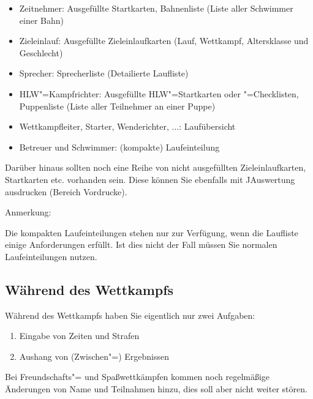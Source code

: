 \documentclass[11pt,a4paper,twoside,ngerman]{article}
\begin{document}
\begin{itemize}

\item Zeitnehmer: Ausgefüllte Startkarten, Bahnenliste (Liste aller Schwimmer einer Bahn)


\item Zieleinlauf: Ausgefüllte Zieleinlaufkarten (Lauf, Wettkampf, Altersklasse und Geschlecht)


\item Sprecher: Sprecherliste (Detailierte Laufliste)


\item HLW"=Kampfrichter: Ausgefüllte HLW"=Startkarten oder "=Checklisten, Puppenliste (Liste aller Teilnehmer an einer Puppe)


\item Wettkampfleiter, Starter, Wenderichter, ...: Laufübersicht


\item Betreuer und Schwimmer: (kompakte) Laufeinteilung


\end{itemize}
Darüber hinaus sollten noch eine Reihe von nicht ausgefüllten Zieleinlaufkarten, Startkarten etc. vorhanden sein. Diese können Sie ebenfalls mit JAuswertung ausdrucken (Bereich \glqq{}Vordrucke\grqq{}).

\begin{bfseries}Anmerkung:\end{bfseries} Die kompakten Laufeinteilungen stehen nur zur Verfügung, wenn die Laufliste einige Anforderungen erfüllt. Ist dies nicht der Fall müssen Sie normalen Laufeinteilungen nutzen.


\newpage

\subsection{Während des Wettkampfs}
\label{lbl:währenddeswettkampfs::begin}
Während des Wettkampfs haben Sie eigentlich nur zwei Aufgaben:


\begin{enumerate}

\item Eingabe von Zeiten und Strafen


\item Aushang von (Zwischen"=) Ergebnissen


\end{enumerate}
Bei Freundschafts"= und Spaßwettkämpfen kommen noch regelmäßige Änderungen von Name und Teilnahmen hinzu, dies soll aber nicht weiter stören.
\end{document}
